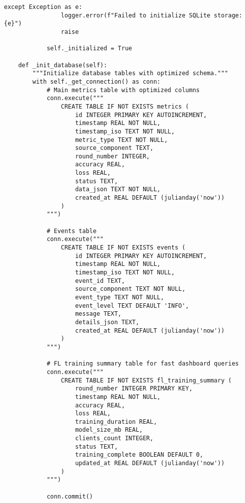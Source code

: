 \begin{lstlisting}[style=pythoncode, caption=Time Series Storage Implementation]
            except Exception as e:
                logger.error(f"Failed to initialize SQLite storage: {e}")
                raise

            self._initialized = True

    def _init_database(self):
        """Initialize database tables with optimized schema."""
        with self._get_connection() as conn:
            # Main metrics table with optimized columns
            conn.execute("""
                CREATE TABLE IF NOT EXISTS metrics (
                    id INTEGER PRIMARY KEY AUTOINCREMENT,
                    timestamp REAL NOT NULL,
                    timestamp_iso TEXT NOT NULL,
                    metric_type TEXT NOT NULL,
                    source_component TEXT,
                    round_number INTEGER,
                    accuracy REAL,
                    loss REAL,
                    status TEXT,
                    data_json TEXT NOT NULL,
                    created_at REAL DEFAULT (julianday('now'))
                )
            """)
            
            # Events table
            conn.execute("""
                CREATE TABLE IF NOT EXISTS events (
                    id INTEGER PRIMARY KEY AUTOINCREMENT,
                    timestamp REAL NOT NULL,
                    timestamp_iso TEXT NOT NULL,
                    event_id TEXT,
                    source_component TEXT NOT NULL,
                    event_type TEXT NOT NULL,
                    event_level TEXT DEFAULT 'INFO',
                    message TEXT,
                    details_json TEXT,
                    created_at REAL DEFAULT (julianday('now'))
                )
            """)
            
            # FL training summary table for fast dashboard queries
            conn.execute("""
                CREATE TABLE IF NOT EXISTS fl_training_summary (
                    round_number INTEGER PRIMARY KEY,
                    timestamp REAL NOT NULL,
                    accuracy REAL,
                    loss REAL,
                    training_duration REAL,
                    model_size_mb REAL,
                    clients_count INTEGER,
                    status TEXT,
                    training_complete BOOLEAN DEFAULT 0,
                    updated_at REAL DEFAULT (julianday('now'))
                )
            """)
            
            conn.commit()


\end{lstlisting}
